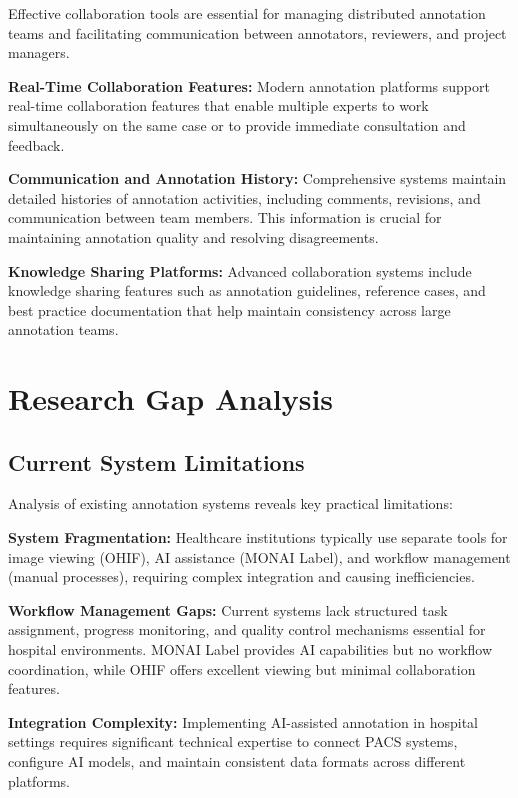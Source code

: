 Effective collaboration tools are essential for managing distributed annotation teams and facilitating communication between annotators, reviewers, and project managers.

\textbf{Real-Time Collaboration Features:} Modern annotation platforms support real-time collaboration features that enable multiple experts to work simultaneously on the same case or to provide immediate consultation and feedback.

\textbf{Communication and Annotation History:} Comprehensive systems maintain detailed histories of annotation activities, including comments, revisions, and communication between team members. This information is crucial for maintaining annotation quality and resolving disagreements.

\textbf{Knowledge Sharing Platforms:} Advanced collaboration systems include knowledge sharing features such as annotation guidelines, reference cases, and best practice documentation that help maintain consistency across large annotation teams.

\section{Research Gap Analysis}

\subsection{Current System Limitations}

Analysis of existing annotation systems reveals key practical limitations:

\textbf{System Fragmentation:} Healthcare institutions typically use separate tools for image viewing (OHIF), AI assistance (MONAI Label), and workflow management (manual processes), requiring complex integration and causing inefficiencies.

\textbf{Workflow Management Gaps:} Current systems lack structured task assignment, progress monitoring, and quality control mechanisms essential for hospital environments. MONAI Label provides AI capabilities but no workflow coordination, while OHIF offers excellent viewing but minimal collaboration features.

\textbf{Integration Complexity:} Implementing AI-assisted annotation in hospital settings requires significant technical expertise to connect PACS systems, configure AI models, and maintain consistent data formats across different platforms.

